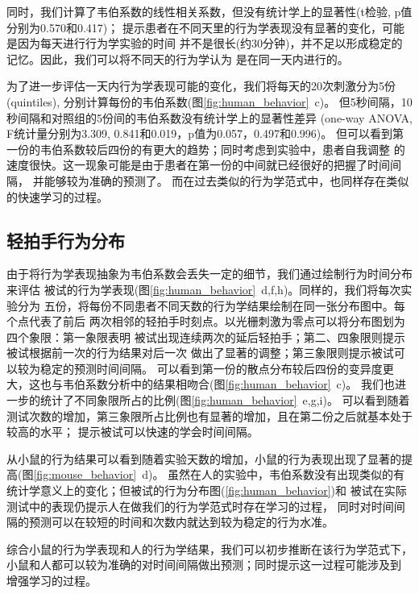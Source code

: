 同时，我们计算了韦伯系数的线性相关系数，但没有统计学上的显著性(t检验, p值分别为0.570和0.417)；
提示患者在不同天里的行为学表现没有显著的变化，可能是因为每天进行行为学实验的时间
并不是很长(约30分钟)，并不足以形成稳定的记忆。因此，我们可以将不同天的行为学认为
是在同一天内进行的。

为了进一步评估一天内行为学表现可能的变化，我们将每天的20次刺激分为5份(quintiles),
分别计算每份的韦伯系数(图\ref{fig:human_behavior}~c)。
但5秒间隔，10秒间隔和对照组的5份间的韦伯系数没有统计学上的显著性差异
(one-way ANOVA, F统计量分别为3.309, 0.841和0.019，p值为0.057，0.497和0.996)。
但可以看到第一份的韦伯系数较后四份的有更大的趋势；同时考虑到实验中，患者自我调整
的速度很快。这一现象可能是由于患者在第一份的中间就已经很好的把握了时间间隔，
并能够较为准确的预测了。
而在过去类似的行为学范式中，也同样存在类似的快速学习的过程\cite{simen2011model}。

\subsection{轻拍手行为分布}
由于将行为学表现抽象为韦伯系数会丢失一定的细节，我们通过绘制行为时间分布来评估
被试的行为学表现(图\ref{fig:human_behavior}~d,f,h)。同样的，我们将每次实验分为
五份，将每份不同患者不同天数的行为学结果绘制在同一张分布图中。每个点代表了前后
两次相邻的轻拍手时刻点。以光栅刺激为零点可以将分布图划为四个象限：第一象限表明
被试出现连续两次的延后轻拍手；第二、四象限则提示被试根据前一次的行为结果对后一次
做出了显著的调整；第三象限则提示被试可以较为稳定的预测时间间隔。
可以看到第一份的散点分布较后四份的变异度更大，这也与韦伯系数分析中的结果相吻合(图\ref{fig:human_behavior}~c)。
我们也进一步的统计了不同象限所占的比例(图\ref{fig:human_behavior}~e,g,i)。
可以看到随着测试次数的增加，第三象限所占比例也有显著的增加，且在第二份之后就基本处于较高的水平；
提示被试可以快速的学会时间间隔。

\bigskip
从小鼠的行为结果可以看到随着实验天数的增加，小鼠的行为表现出现了显著的提高(图\ref{fig:mouse_behavior}~d)。
虽然在人的实验中，韦伯系数没有出现类似的有统计学意义上的变化；但被试的行为分布图(\ref{fig:human_behavior})和
被试在实际测试中的表现仍提示人在做我们的行为学范式时存在学习的过程，
同时对时间间隔的预测可以在较短的时间和次数内就达到较为稳定的行为水准。

综合小鼠的行为学表现和人的行为学结果，我们可以初步推断在该行为学范式下，
小鼠和人都可以较为准确的对时间间隔做出预测；同时提示这一过程可能涉及到
增强学习的过程。







